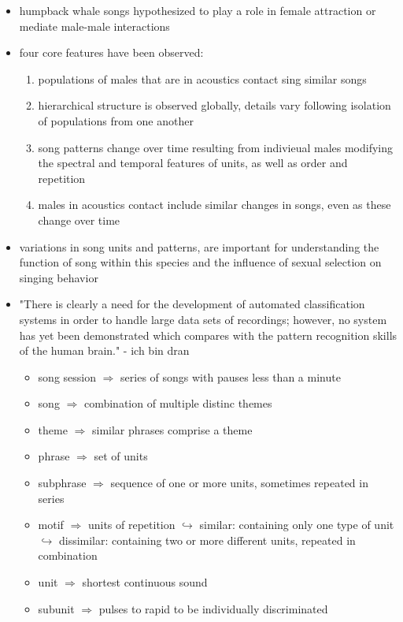 \documentclass[12pt,a4paper]{article}
\begin{document}
\begin{itemize} 
  \item humpback whale songs hypothesized to play a role in female attraction or mediate male-male interactions \cite{cholewiak_humpback_2013}
  \item four core features have been observed:
  \begin{enumerate}
    \item populations of males that are in acoustics contact sing similar songs
    \item hierarchical structure is observed globally, details vary following isolation of populations from one another
    \item song patterns change over time resulting from indivieual males modifying the spectral and temporal features of units, as well as order and repetition
    \item males in acoustics contact include similar changes in songs, even as these change over time
  \end{enumerate}
  \item variations in song units and patterns, are important for understanding the function of song within this species and the influence of sexual selection on singing behavior
  \item "There is clearly a need for the development of automated classification systems in order to handle large data sets of recordings; however, no system has yet been demonstrated which compares with the pattern recognition skills of the human brain." - ich bin dran
    \begin{itemize}
      \item song session          $\Longrightarrow$  series of songs with pauses less than a minute
      \item song                $\Longrightarrow$  combination of multiple distinc themes
      \item theme             $\Longrightarrow$  similar phrases comprise a theme
      \item phrase          $\Longrightarrow$  set of units
      \item subphrase     $\Longrightarrow$  sequence of one or more units, sometimes repeated in series
      \item motif       $\Longrightarrow$  units of repetition 
      \newline \indent $\hookrightarrow$ similar:     containing only one type of unit
      \newline \indent $\hookrightarrow$ dissimilar:  containing two or more different units, repeated in combination
      \item unit      $\Longrightarrow$  shortest continuous sound
      \item subunit $\Longrightarrow$  pulses to rapid to be individually discriminated
    \end{itemize}


\end{itemize}
\end{document}
